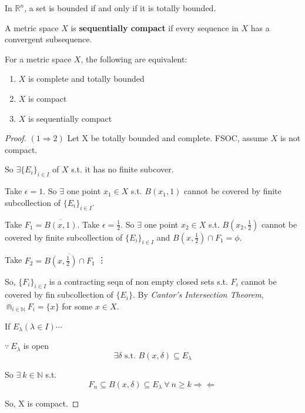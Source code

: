 \documentclass{functionspaces}
\begin{document}
\begin{proposition}
In $\mathbb{R}^n$, a set is bounded if and only if it is totally bounded.
\end{proposition}

\begin{definition}
A metric space $X$ is \textbf{sequentially compact} if every sequence in $X$ has a convergent subsequence.
\end{definition}

\begin{theorem}
For a metric space $X$, the following are equivalent:
\begin{enumerate}
\item $X$ is complete and totally bounded
\item $X$ is compact
\item $X$ is sequentially compact
\end{enumerate}
\end{theorem}

\begin{proof}
$(1 \Rightarrow 2)$ Let X be totally bounded and complete. FSOC, assume $X$ is not compact. 

So $ \exists \{E_i\}_{i\in I}$ of $X$ s.t. it has no finite subcover.

Take $\epsilon = 1$. So $\exists$ one point $x_1 \in X$ s.t. $B(x_1,1)$ cannot be covered by finite subcollection of $\{E_i\}_{i \in I}$.

Take $F_1 = \overline{B(x,1)}$. Take $\epsilon = \frac{1}{2}$. So $\exists$ one point $x_2 \in X$ s.t. $B(x_2, \frac{1}{2})$ cannot be covered by finite subcollection of $\{E_i\}_{i \in I}$ and $B(x, \frac{1}{2}) \cap F_1 = \phi$.

Take $F_2 = \overline{B(x,\frac{1}{2}) \cap F_1}$
\vdots

So, $\{F_i\}_{i \in I}$ is a contracting seqn of non empty closed sets s.t. $F_i$ cannot be covered by fin subcollection of $\{E_i\}$. By \emph{Cantor's Intersection Theorem}, $\Cap_{i\in \mathbb N} F_i = \{x\}$ for some $x \in X$.

If $E_\lambda (\lambda \in I) \cdots $

$\because\ E_\lambda$ is open $$ \exists\delta \text{ s.t. } B(x, \delta) \subseteq E_\lambda $$

So $\exists\ k \in \mathbb N$ s.t. $$ F_n \subseteq B(x, \delta) \subseteq E_\lambda\ \forall\ n \geq k \Rightarrow\Leftarrow $$

So, X is compact.

\end{proof}
\end{document}
